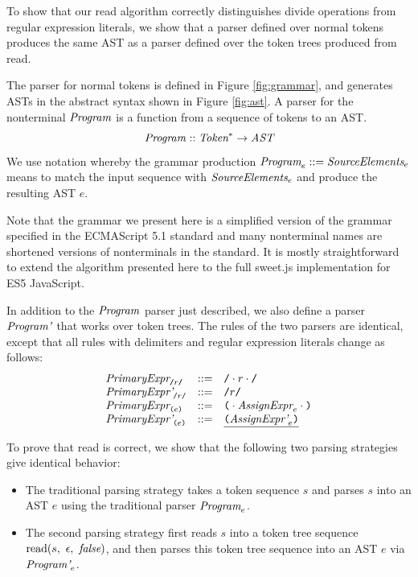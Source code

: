 \documentclass[9pt]{sigplanconf}
\begin{document}
To show that our read algorithm correctly distinguishes 
divide operations from regular expression literals, we show that
a parser defined over normal tokens produces the same AST as a parser
defined over the token trees produced from read.

The parser for normal tokens is defined in Figure \ref{fig:grammar},
and generates ASTs in the abstract syntax shown in Figure \ref{fig:ast}. A
parser for the nonterminal \( \textit{Program}_{} \) is a function from a
sequence of tokens to an AST.
\[
\textit{Program}_{} :: \textit{Token}^* \rightarrow \textit{AST}
\]
We use notation whereby the grammar production $\textit{Program}_{e} ::= \textit{SourceElements}_{e}$
means to match the input sequence with $\textit{SourceElements}_{e}$ and
produce the resulting AST $e$.

Note that the grammar we present here is a simplified version of the
grammar specified in the ECMAScript 5.1 standard \cite{International2011}
and many nonterminal names are shortened
versions of nonterminals in the standard.
It is mostly straightforward to extend the algorithm
presented here 
to 
the full sweet.js implementation for ES5 JavaScript.

In addition to the \( \textit{Program}_{} \) parser just described, we
also define a parser \( \textit{Program'}_{} \) that works over token
trees. The rules of the two parsers are identical, except that
all rules with delimiters and regular expression literals change as follows:
\[
\begin{array}{lcl}
  \textit{PrimaryExpr}_{\texttt{/}r\texttt{/}} &::=& \texttt{/}\cdot r \cdot \texttt{/}
  \\
  \textit{PrimaryExpr'}_{\texttt{/}r\texttt{/}} &::=& \texttt{/}r\texttt{/}
  \\
  \textit{PrimaryExpr}_{\texttt{(} e \texttt{)}} &::=& 
  \texttt{(} \cdot \textit{AssignExpr}_{e} \cdot \texttt{)}
  \\
  \textit{PrimaryExpr'}_{\texttt{(} e \texttt{)}} &::=& 
  \underline{ \texttt{(} \textit{AssignExpr'}_{e} \texttt{)}}
  \\
\end{array}
\]

To prove that read is correct, we show that the following two parsing
strategies give identical behavior:
\begin{itemize}
\item The traditional parsing strategy takes a token sequence \( s
  \) and parses \( s \) into an AST \( e \) using the traditional parser
  \( \textit{Program}_{e} \).

\item The second parsing strategy first reads \( s \) into a token
  tree sequence \( \textrm{read}(s,~\epsilon,~\textit{false}) \), and then parses
  this token tree sequence into an AST \( e \) via \( \textit{Program'}_{e} \).
\end{itemize}
\end{document}
